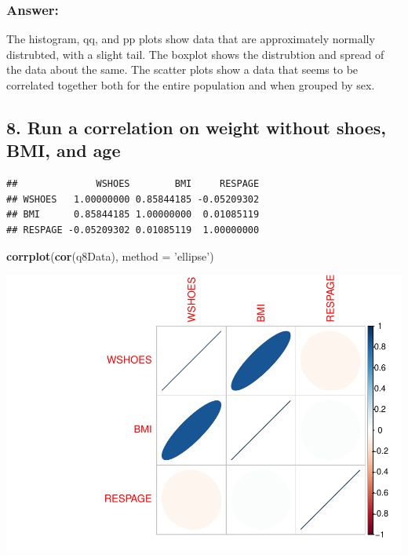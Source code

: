\documentclass[]{article}
\newenvironment{Shaded}{\begin{snugshade}}{\end{snugshade}}
\newcommand{\DataTypeTok}[1]{\textcolor[rgb]{0.13,0.29,0.53}{#1}}
\newcommand{\KeywordTok}[1]{\textcolor[rgb]{0.13,0.29,0.53}{\textbf{#1}}}
\newcommand{\NormalTok}[1]{#1}
\newcommand{\OperatorTok}[1]{\textcolor[rgb]{0.81,0.36,0.00}{\textbf{#1}}}
\newcommand{\StringTok}[1]{\textcolor[rgb]{0.31,0.60,0.02}{#1}}
\begin{document}
\hypertarget{answer-6}{%
\subsubsection{Answer:}\label{answer-6}}

The histogram, qq, and pp plots show data that are approximately
normally distrubted, with a slight tail. The boxplot shows the
distrubtion and spread of the data about the same. The scatter plots
show a data that seems to be correlated together both for the entire
population and when grouped by sex.

\hypertarget{run-a-correlation-on-weight-without-shoes-bmi-and-age}{%
\subsection{8. Run a correlation on weight without shoes, BMI, and
age}\label{run-a-correlation-on-weight-without-shoes-bmi-and-age}}

\begin{Shaded}
\end{Shaded}

\begin{verbatim}
##              WSHOES        BMI     RESPAGE
## WSHOES   1.00000000 0.85844185 -0.05209302
## BMI      0.85844185 1.00000000  0.01085119
## RESPAGE -0.05209302 0.01085119  1.00000000
\end{verbatim}

\begin{Shaded}
\begin{Highlighting}[]
\KeywordTok{corrplot}\NormalTok{(}\KeywordTok{cor}\NormalTok{(q8Data), }\DataTypeTok{method =} \StringTok{'ellipse'}\NormalTok{)}
\end{Highlighting}
\end{Shaded}

\includegraphics{assignment2_files/figure-latex/q8-1.pdf}
\end{document}
